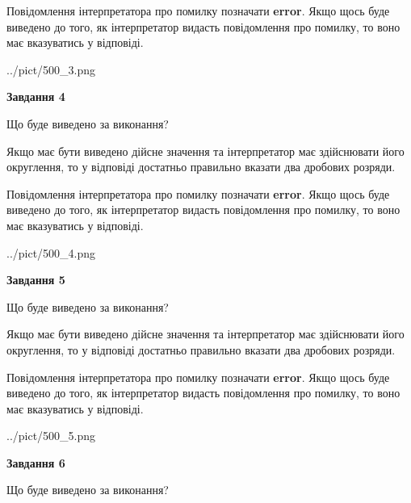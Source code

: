 \documentclass[12pt, ukrainian]{article}
\begin{document}
{\begin {Large}
Повідомлення інтерпретатора про помилку позначати \textbf{error}.
Якщо щось буде виведено до того, як інтерпретатор видасть повідомлення про помилку, 
то воно має вказуватись у відповіді. \par

\begin{center}
	{../pict/500_3.png}
\end{center}
\newpage

{\begin {center}\textbf{Завдання 4}\end {center}}\par
Що буде виведено за виконання? \par

Якщо має бути виведено дійсне значення та інтерпретатор має здійснювати його округлення, 
то у відповіді достатньо правильно вказати два дробових розряди.

Повідомлення інтерпретатора про помилку позначати \textbf{error}.
Якщо щось буде виведено до того, як інтерпретатор видасть повідомлення про помилку, 
то воно має вказуватись у відповіді. \par

\begin{center}
	{../pict/500_4.png}
\end{center}
\newpage

{\begin {center}\textbf{Завдання 5}\end {center}}\par
Що буде виведено за виконання? \par

Якщо має бути виведено дійсне значення та інтерпретатор має здійснювати його округлення, 
то у відповіді достатньо правильно вказати два дробових розряди.

Повідомлення інтерпретатора про помилку позначати \textbf{error}.
Якщо щось буде виведено до того, як інтерпретатор видасть повідомлення про помилку, 
то воно має вказуватись у відповіді. \par

\begin{center}
	{../pict/500_5.png}
\end{center}
\newpage

{\begin {center}\textbf{Завдання 6}\end {center}}\par
Що буде виведено за виконання? \par


\end{Large}}
\end{document}
